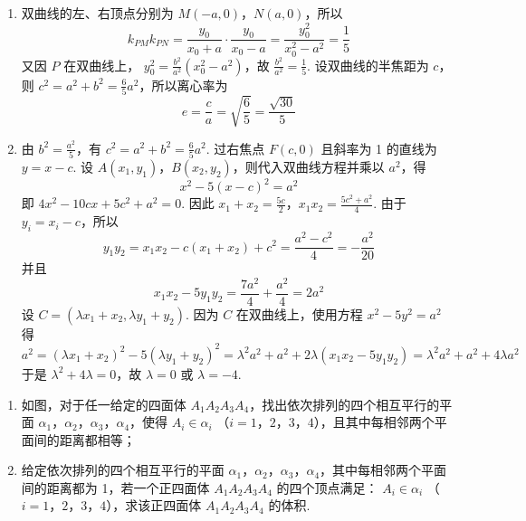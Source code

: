 \begin{solution}
\begin{enumerate}
\item 双曲线的左、右顶点分别为 \(M(-a,0)\)，\(N(a,0)\)，所以
\[
k_{PM}k_{PN}=\frac{y_0}{x_0+a}\cdot\frac{y_0}{x_0-a}
=\frac{y_0^2}{x_0^2-a^2}=\frac{1}{5}
\]
又因 \(P\) 在双曲线上，
\(y_0^2=\frac{b^2}{a^2}(x_0^2-a^2)\)，故
\(\frac{b^2}{a^2}=\frac{1}{5}\). 设双曲线的半焦距为 \(c\)，则
\(c^2=a^2+b^2=\frac{6}{5}a^2\)，所以离心率为
\[
e=\frac{c}{a}=\sqrt{\frac{6}{5}}=\frac{\sqrt{30}}{5}
\]

\item 由 \(b^2=\frac{a^2}{5}\)，有 \(c^2=a^2+b^2=\frac{6}{5}a^2\). 过右焦点
\(F(c,0)\) 且斜率为 1 的直线为 \(y=x-c\). 设
\(A(x_1,y_1)\)，\(B(x_2,y_2)\)，则代入双曲线方程并乘以 \(a^2\)，得
\[
x^2-5(x-c)^2=a^2
\]
即
\(4x^2-10cx+5c^2+a^2=0\). 因此
\(x_1+x_2=\frac{5c}{2}\)，\(x_1x_2=\frac{5c^2+a^2}{4}\).
由于 \(y_i=x_i-c\)，所以
\[
y_1y_2=x_1x_2-c(x_1+x_2)+c^2=\frac{a^2-c^2}{4}=-\frac{a^2}{20}
\]
并且
\[
x_1x_2-5y_1y_2=\frac{7a^2}{4}+\frac{a^2}{4}=2a^2
\]
设 \(C=(\lambda x_1+x_2,\lambda y_1+y_2)\). 因为 \(C\) 在双曲线上，使用方程
\(x^2-5y^2=a^2\) 得
\[
a^2=(\lambda x_1+x_2)^2-5(\lambda y_1+y_2)^2
=\lambda^2a^2+a^2+2\lambda(x_1x_2-5y_1y_2)
=\lambda^2a^2+a^2+4\lambda a^2
\]
于是 \(\lambda^2+4\lambda=0\)，故
\(\lambda=0\) 或 \(\lambda=-4\).
\end{enumerate}
\end{solution}

\begin{problem}
\begin{enumerate}
    \item 如图，对于任一给定的四面体 \(A_{1}A_{2}A_{3}A_{4}\)，找出依次排列的四个相互平行的平面 \(\alpha_{1}\)，\(\alpha_{2}\)，\(\alpha_{3}\)，\(\alpha_{4}\)，使得 \(A_{i} \in \alpha_{i}\) （\(i = 1\)，\(2\)，\(3\)，\(4\)），且其中每相邻两个平面间的距离都相等；
    \item 给定依次排列的四个相互平行的平面 \(\alpha_{1}\)，\(\alpha_{2}\)，\(\alpha_{3}\)，\(\alpha_{4}\)，其中每相邻两个平面间的距离都为 1，若一个正四面体 \(A_{1}A_{2}A_{3}A_{4}\) 的四个顶点满足： \(A_{i} \in \alpha_{i}\) （\(i = 1\)，\(2\)，\(3\)，\(4\)），求该正四面体 \(A_{1}A_{2}A_{3}A_{4}\) 的体积.
\end{enumerate}

\end{problem}


